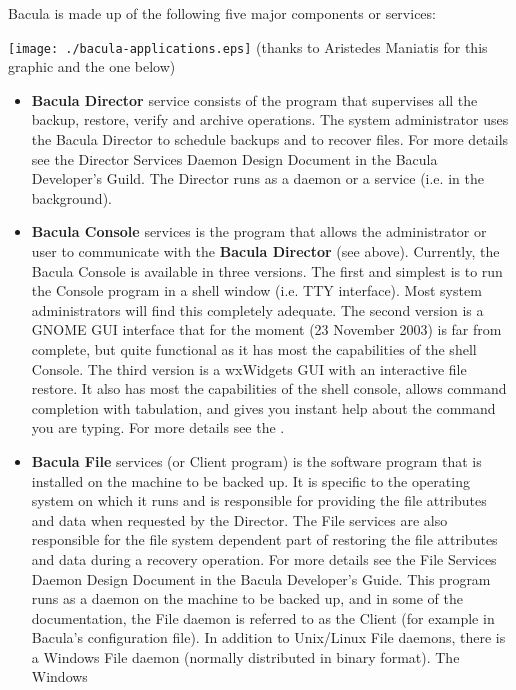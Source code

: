Bacula is made up of the following five major components or services: 

\texttt{[image: ./bacula-applications.eps]} 
(thanks to Aristedes Maniatis for this graphic and the one below) 

\begin{itemize}
\item 
   \label{DirDef}
   {\bf Bacula Director} service consists of the program that  supervises all the
backup, restore, verify and archive operations.  The system administrator uses
the Bacula Director to schedule  backups and to recover files. For more
details see the  Director Services Daemon Design Document in the Bacula
Developer's  Guild.  The Director runs as a daemon or a service (i.e. in the
background). 
\item 
   \label{UADef}
   {\bf Bacula Console} services is the program that allows the  administrator or
user to communicate with the {\bf Bacula Director}  (see above). Currently,
the Bacula Console is available in three  versions. The first and simplest is
to run the Console program in a  shell window (i.e. TTY interface). Most
system administrators will  find this completely adequate. The second version
is a GNOME GUI  interface that for the moment (23 November 2003) is far from
complete,  but quite functional as it has most the capabilities of the shell 
Console. The third version is a wxWidgets GUI with an interactive file 
restore. It also has most the capabilities of the shell console,  allows
command completion with tabulation, and gives you instant  help about the
command you are typing. For more details see the  
. 
\item 
   \label{FDDef}
   {\bf Bacula File} services (or Client program) is the software  program that
is installed on the machine to be backed up. It is  specific to the operating
system on which it runs and is responsible  for providing the file attributes
and data when requested by the  Director. The File services are also
responsible for the file  system dependent part of restoring the file
attributes and data  during a recovery operation. For more details see the 
File Services Daemon Design Document in the Bacula Developer's Guide. This 
program runs as a daemon on the machine to be backed up, and in some  of the
documentation, the File daemon is referred to as the Client  (for example in
Bacula's configuration file). In addition to  Unix/Linux File daemons, there
is a Windows File daemon (normally  distributed in binary format). The Windows

\end{itemize}
